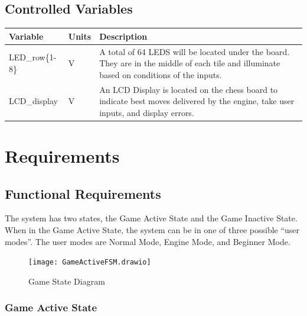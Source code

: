 \documentclass[12pt]{article}
\begin{document}
\subsection{Controlled Variables}

\begin{table}[H]
  \centering
      \setlength{\leftmargini}{0.4cm}
      \begin{tabular}{| >{\centering\arraybackslash}m{3cm} | 
        >{\centering\arraybackslash}m{2cm} | 
        >{\centering\arraybackslash}m{9cm} |}
      \hline
      \rowcolor[gray]{0.9}
      Variable & Units & Description\\
      \hline 
      LED\_row\{1-8\} & \si{\volt} & A total of 64 LEDS will be located under the board. They 
      are in the middle of each tile and illuminate based on conditions of the inputs. \\
      \hline 
      LCD\_display & \si{\volt} & An LCD Display is located on the chess board to indicate best moves delivered by the engine, take user inputs, and display errors. \\
      \hline 
      \end{tabular}
  \label{Table1}
  \end{table}


\section{Requirements}
\subsection{Functional Requirements}
{The system has two states, the Game Active State and the Game Inactive State. When in the Game Active State, the system can be in one of three possible ``user modes''. The user modes are Normal Mode, Engine Mode, and Beginner Mode.}

\begin{figure}[h]
    \begin{center}
        \texttt{[image: GameActiveFSM.drawio]}
        \caption{Game State Diagram}
        \label{Fig_GameStates} 
    \end{center}
\end{figure}

\subsubsection{Game Active State}
\end{document}
